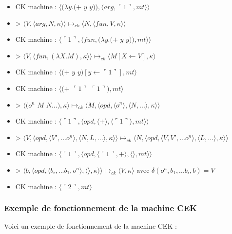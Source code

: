 \documentclass[10pt,a4paper]{article}
\begin{document}
\begin{itemize}
						\item[] CK machine : $\langle(\lambda y.(+$ $y$ $y)),\langle arg,\ulcorner 1\urcorner,mt\rangle\rangle$	
						\item[] > $\langle V,\langle arg,N,\kappa \rangle \rangle \longmapsto_{ck} \langle N,\langle fun,V,\kappa \rangle \rangle$
						\item[] CK machine : $\langle\ulcorner 1\urcorner,\langle fun,(\lambda y.(+$ $y$ $y)),mt\rangle\rangle$	
						\item[] > $\langle V,\langle fun,(\lambda X.M),\kappa \rangle \rangle \longmapsto_{ck} \langle M[X \leftarrow V],\kappa\rangle$	
						\item[] CK machine : $\langle(+$ $y$ $y)[y \leftarrow\ulcorner 1\urcorner],mt\rangle$
						\item[] CK machine : $\langle(+$ $\ulcorner 1\urcorner$ $\ulcorner 1\urcorner),mt\rangle$
						\item[] > $\langle(o^{n}$ $M$ $N...),\kappa\rangle \longmapsto_{ck} \langle M,\langle opd,\langle o^{n}\rangle,\langle N,...\rangle,\kappa\rangle\rangle$
						\item[] CK machine : $\langle\ulcorner 1\urcorner,\langle opd,\langle + \rangle,\langle\ulcorner 1\urcorner\rangle,mt\rangle\rangle$
						\item[] > $\langle V,\langle opd,\langle V',...o^{n}\rangle,\langle N,L,...\rangle,\kappa\rangle\rangle \longmapsto_{ck} \langle N,\langle opd,\langle V,V',...o^{n}\rangle,\langle L,...\rangle,\kappa\rangle\rangle$
						\item[] CK machine : $\langle\ulcorner 1\urcorner,\langle opd,\langle\ulcorner 1\urcorner,+ \rangle,\langle\rangle,mt\rangle\rangle$
						\item[] > $\langle b,\langle opd,\langle b_{i},...b_{1},o^{n}\rangle,\langle\rangle,\kappa\rangle\rangle \longmapsto_{ck} \langle V,\kappa\rangle$ avec $\delta(o^{n},b_{1},...b_{i},b) = V$
						\item[] CK machine : $\langle\ulcorner 2\urcorner,mt\rangle$
					\end{itemize}
				\newpage
				
				\subsubsection{Exemple de fonctionnement de la machine CEK}\label{CEK}
					
					Voici un exemple de fonctionnement de la machine CEK :
					
\end{document}
